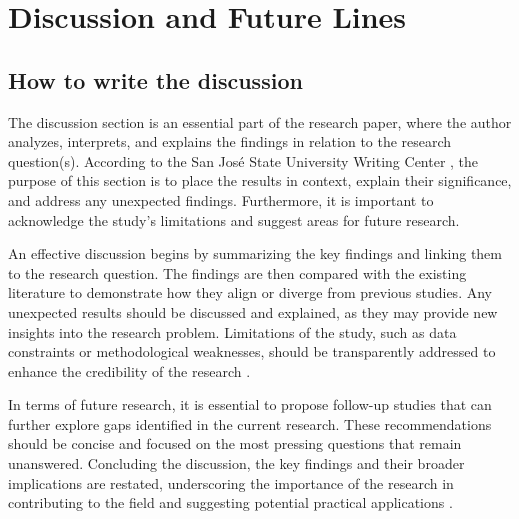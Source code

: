 \setcounter{chapter}{4}
\chapter{Discussion and Future Lines} \label{chap::disscusionFutureLines}
\section{How to write the discussion}
The discussion section is an essential part of the research paper, where the author analyzes, interprets, and explains the findings in relation to the research question(s). According to the San José State University Writing Center \cite{SJSUWritingCenterDiscussion}, the purpose of this section is to place the results in context, explain their significance, and address any unexpected findings. Furthermore, it is important to acknowledge the study's limitations and suggest areas for future research.

An effective discussion begins by summarizing the key findings and linking them to the research question. The findings are then compared with the existing literature to demonstrate how they align or diverge from previous studies. Any unexpected results should be discussed and explained, as they may provide new insights into the research problem. Limitations of the study, such as data constraints or methodological weaknesses, should be transparently addressed to enhance the credibility of the research \cite{SJSUWritingCenterDiscussion}.

In terms of future research, it is essential to propose follow-up studies that can further explore gaps identified in the current research. These recommendations should be concise and focused on the most pressing questions that remain unanswered. Concluding the discussion, the key findings and their broader implications are restated, underscoring the importance of the research in contributing to the field and suggesting potential practical applications \cite{SJSUWritingCenterDiscussion}.
